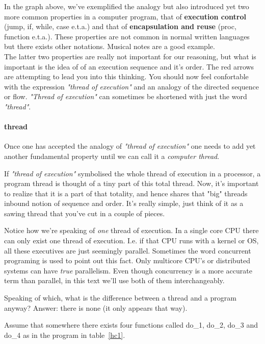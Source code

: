 	In the graph above, we've exemplified the analogy but also introduced yet two more common properties in a computer program, that of \textbf{execution control} (jump, if, while, case e.t.a.) and that of \textbf{encapsulation and reuse} (proc, function e.t.a.). These properties are not common in normal written languages but there exists other notations. Musical notes are a good example.
\\
	The latter two properties are really not important for our reasoning, but what is important is the idea of of an execution sequence and it's order. The red arrows are attempting to lead you into this thinking. You should now feel confortable with the expression \textit{"thread of execution"} and an analogy of the directed sequence or flow. \textit{"Thread of execution"} can sometimes be shortened with just the word \textit{"thread"}.

	\paragraph{thread}
	\label{genesis_thread}
		Once one has accepted the analogy of \textit{"thread of execution"} one needs to add yet another fundamental property until we can call it a \textit{computer thread}.

		If \textit{"thread of execution"} symbolised the whole thread of execution in a processor, a program thread is thought of a tiny part of this total thread. Now, it's important to realize that it is a part of that totality, and hence shares that "big" threads inbound notion of sequence and order. It's really simple, just think of it as a sawing thread that you've cut in a couple of pieces.

		Notice how we're speaking of \textit{one} thread of execution. In a single core CPU there can only exist one thread of execution. I.e. if that CPU runs with a kernel or OS, all these executives are just seemingly parallel. Sometimes the word concurrent programing is used to point out this fact. Only multicore CPU's or distributed systems can have \textit{true} parallelism. Even though concurrency is  a more accurate term than parallel, in this text we'll use both of them interchangeably.

		Speaking of which, what is the difference between a thread and a program anyway?
		Answer: there is none (it only appears that way).

		Assume that somewhere there exists four functions called  do\_1, do\_2, do\_3 and do\_4 as in the program in table~\ref{hc1}.

